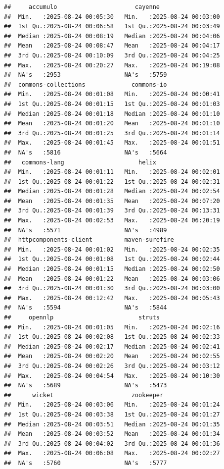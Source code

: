 \documentclass[
]{article}
\begin{document}
\begin{verbatim}
##     accumulo                      cayenne                   
##  Min.   :2025-08-24 00:05:30   Min.   :2025-08-24 00:03:00  
##  1st Qu.:2025-08-24 00:06:58   1st Qu.:2025-08-24 00:03:49  
##  Median :2025-08-24 00:08:19   Median :2025-08-24 00:04:06  
##  Mean   :2025-08-24 00:08:47   Mean   :2025-08-24 00:04:17  
##  3rd Qu.:2025-08-24 00:10:09   3rd Qu.:2025-08-24 00:04:25  
##  Max.   :2025-08-24 00:20:27   Max.   :2025-08-24 00:19:08  
##  NA's   :2953                  NA's   :5759                 
##  commons-collections             commons-io                 
##  Min.   :2025-08-24 00:01:08   Min.   :2025-08-24 00:00:41  
##  1st Qu.:2025-08-24 00:01:15   1st Qu.:2025-08-24 00:01:03  
##  Median :2025-08-24 00:01:18   Median :2025-08-24 00:01:10  
##  Mean   :2025-08-24 00:01:20   Mean   :2025-08-24 00:01:10  
##  3rd Qu.:2025-08-24 00:01:25   3rd Qu.:2025-08-24 00:01:14  
##  Max.   :2025-08-24 00:01:45   Max.   :2025-08-24 00:01:51  
##  NA's   :5816                  NA's   :5664                 
##   commons-lang                     helix                    
##  Min.   :2025-08-24 00:01:11   Min.   :2025-08-24 00:02:01  
##  1st Qu.:2025-08-24 00:01:22   1st Qu.:2025-08-24 00:02:31  
##  Median :2025-08-24 00:01:28   Median :2025-08-24 00:02:54  
##  Mean   :2025-08-24 00:01:35   Mean   :2025-08-24 00:07:20  
##  3rd Qu.:2025-08-24 00:01:39   3rd Qu.:2025-08-24 00:13:31  
##  Max.   :2025-08-24 00:02:53   Max.   :2025-08-24 06:20:19  
##  NA's   :5571                  NA's   :4989                 
##  httpcomponents-client         maven-surefire               
##  Min.   :2025-08-24 00:01:02   Min.   :2025-08-24 00:02:35  
##  1st Qu.:2025-08-24 00:01:08   1st Qu.:2025-08-24 00:02:44  
##  Median :2025-08-24 00:01:15   Median :2025-08-24 00:02:50  
##  Mean   :2025-08-24 00:01:22   Mean   :2025-08-24 00:03:06  
##  3rd Qu.:2025-08-24 00:01:30   3rd Qu.:2025-08-24 00:03:00  
##  Max.   :2025-08-24 00:12:42   Max.   :2025-08-24 00:05:43  
##  NA's   :5594                  NA's   :5844                 
##     opennlp                        struts                   
##  Min.   :2025-08-24 00:01:05   Min.   :2025-08-24 00:02:16  
##  1st Qu.:2025-08-24 00:02:08   1st Qu.:2025-08-24 00:02:33  
##  Median :2025-08-24 00:02:17   Median :2025-08-24 00:02:41  
##  Mean   :2025-08-24 00:02:20   Mean   :2025-08-24 00:02:55  
##  3rd Qu.:2025-08-24 00:02:26   3rd Qu.:2025-08-24 00:03:12  
##  Max.   :2025-08-24 00:04:54   Max.   :2025-08-24 00:10:30  
##  NA's   :5689                  NA's   :5473                 
##      wicket                      zookeeper                  
##  Min.   :2025-08-24 00:03:06   Min.   :2025-08-24 00:01:24  
##  1st Qu.:2025-08-24 00:03:38   1st Qu.:2025-08-24 00:01:27  
##  Median :2025-08-24 00:03:51   Median :2025-08-24 00:01:35  
##  Mean   :2025-08-24 00:03:52   Mean   :2025-08-24 00:01:34  
##  3rd Qu.:2025-08-24 00:04:02   3rd Qu.:2025-08-24 00:01:36  
##  Max.   :2025-08-24 00:06:08   Max.   :2025-08-24 00:02:27  
##  NA's   :5760                  NA's   :5777
\end{verbatim}
\end{document}
